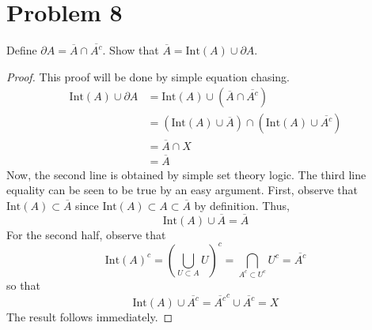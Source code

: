 \documentclass[fontsize=11pt]{scrartcl} %
\numberwithin{equation}{section} %
\numberwithin{figure}{section} %
\numberwithin{table}{section} %
\begin{document}
\section*{Problem 8}
Define $\partial A = \overline{A}\cap\overline{A^c}$. Show that $\overline{A} = \textrm{Int}(A)\cup\partial A$.
\\
\begin{proof}
This proof will be done by simple equation chasing.
\[
\begin{aligned}
\textrm{Int}(A)\cup\partial A &= \textrm{Int}(A)\cup(\overline{A}\cap\overline{A^c})\\
        &=(\textrm{Int}(A) \cup \overline{A})\cap(\textrm{Int}(A) \cup\overline{A^c})\\
        &=\overline{A}\cap X\\
        &= \overline{A}
\end{aligned}
\]
Now, the second line is obtained by simple set theory logic.
The third line equality can be seen to be true by an easy argument. First, observe
that $\textrm{Int}(A) \subset \overline{A}$ since $\textrm{Int}(A)\subset A \subset\overline{A}$ by
definition. Thus, 
\[
\textrm{Int}(A)\cup\overline{A} = \overline{A}
\]
For the second half,
observe that 
\[
\textrm{Int}(A)^c = (\bigcup_{U\subset A} U)^c = \bigcap_{A^c\subset U^c}U^c = \overline{A^c}
\]
so that 
\[
\textrm{Int}(A)\cup\overline{A^c} = \overline{A^c}^c\cup\overline{A^c} = X
\]
The result follows immediately.
\end{proof}
\end{document}

